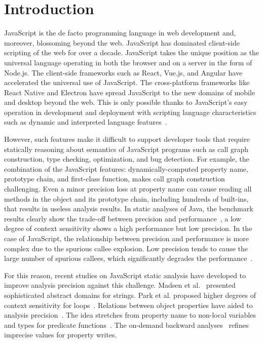 \section{Introduction}\label{sec:intro}
JavaScript is the de facto programming language in web development and,
moreover, blossoming beyond the web.
JavaScript has dominated client-side scripting of the web for over a decade.
JavaScript takes the unique position as the universal language operating in both
the browser and on a server in the form of Node.js.
The client-side frameworks such as React, Vue.js, and Angular have accelerated
the universal use of JavaScript.
The cross-platform frameworks like React Native and Electron have spread
JavaScript to the new domains of mobile and desktop beyond the web.
This is only possible thanks to JavaScript's easy operation in development and
deployment with scripting language characteristics such as dynamic and
interpreted language features~\cite{weaklySPE}.


However, such features make it difficult to support developer tools that require
statically reasoning about semantics of JavaScript programs such as call graph
construction, type checking, optimization, and bug detection.
For example, the combination of the JavaScript features: dynamically-computed
property name, prototype chain, and first-class function, makes call graph
construction challenging.
Even a minor precision loss at property name can cause reading all methods in
the object and its prototype chain, including hundreds of built-ins, that
results in useless analysis results.
In static analyses of Java, the benchmark results clearly show the trade-off
between precision and performance~\cite{introspective, data-driven}, a low degree of
context sensitivity shows a high performance but low precision.
In the case of JavaScript, the relationship between precision and performance is
more complex due to the spurious callee explosion.
Low precision tends to cause the large number of spurious callees, which
significantly degrades the performance~\cite{correlation, determinacy-jQuery, weaklySPE, value-refinement}.


For this reason, recent studies on JavaScript static analysis have developed
to improve analysis precision against this challenge.
Madsen et al.~\cite{string, regex, combining-string} presented sophisticated abstract domains for strings.
Park et al. proposed higher degrees of context sensitivity for loops~\cite{lsaECOOP, lsaSPE}.
Relations between object properties have aided to analysis precision~\cite{correlation, weaklyAPLAS, weaklySPE}.
The idea stretches from property name to non-local variables and types for predicate functions~\cite{value-partitioning}.
The on-demand backward analyses~\cite{value-refinement} refines imprecise values for property writes.


